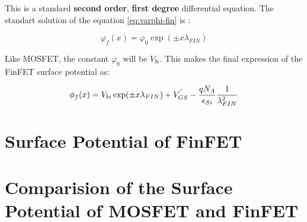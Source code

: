 \documentclass[a4paper]{article}
\begin{document}
This is a standard \textbf{second order}, \textbf{first degree} differential equation. The standart solution of the equation \ref{eq:varphi-fin} is :

\begin{equation}
  \varphi_f(x) = \varphi_0 \exp(\pm x \lambda_{FIN})
\end{equation}

Like MOSFET, the constant $\varphi_0$ will be $V_{bi}$. This makes the final expression of the FinFET surface potential as:

\begin{equation}
  \phi_f(x) = V_{bi} \exp(\pm x \lambda_{FIN}) + V_{GS}^{'} - \frac{qN_A} {\epsilon_{Si}} \frac{1}{\lambda_{FIN}^2}
\end{equation}

\section{Surface Potential of FinFET}

\section{Comparision of the Surface Potential of MOSFET and FinFET}
\end{document}
